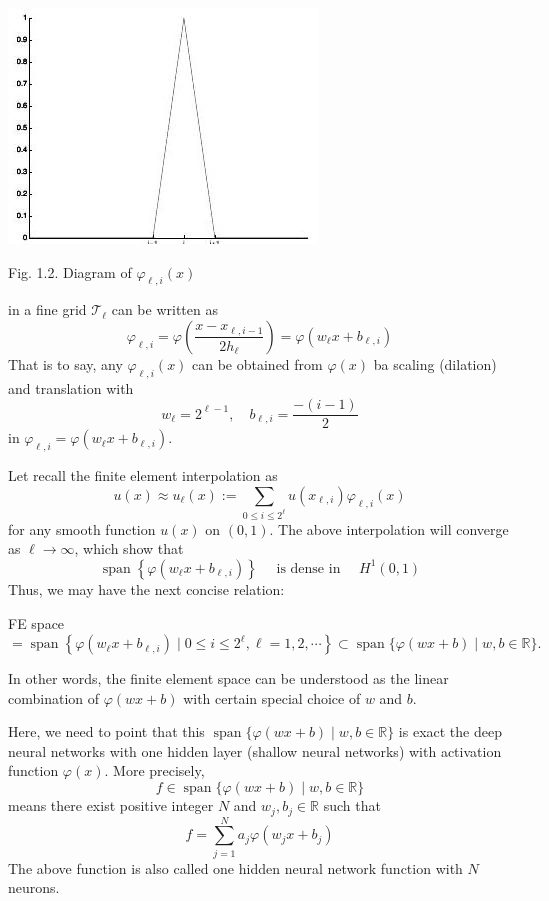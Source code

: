 \documentclass[10pt]{article}
\begin{document}
\includegraphics[max width=\textwidth]{2022_01_05_e65f0d6bf0db4974ee45g-06}

Fig. 1.2. Diagram of $\varphi_{\ell, i}(x)$

in a fine grid $\mathcal{T}_{\ell}$ can be written as
$$
\varphi_{\ell, i}=\varphi\left(\frac{x-x_{\ell, i-1}}{2 h_{\ell}}\right)=\varphi\left(w_{\ell} x+b_{\ell, i}\right)
$$
That is to say, any $\varphi_{\ell, i}(x)$ can be obtained from $\varphi(x)$ ba scaling (dilation) and translation with
$$
w_{\ell}=2^{\ell-1}, \quad b_{\ell, i}=\frac{-(i-1)}{2}
$$
in $\varphi_{\ell, i}=\varphi\left(w_{\ell} x+b_{\ell, i}\right)$.

Let recall the finite element interpolation as
$$
u(x) \approx u_{\ell}(x):=\sum_{0 \leq i \leq 2^{\ell}} u\left(x_{\ell, i}\right) \varphi_{\ell, i}(x)
$$
for any smooth function $u(x)$ on $(0,1)$. The above interpolation will converge as $\ell \rightarrow \infty$, which show that
$$
\operatorname{span}\left\{\varphi\left(w_{\ell} x+b_{\ell, i}\right)\right\} \quad \text { is dense in } \quad H^{1}(0,1)
$$
Thus, we may have the next concise relation:

FE space $=\operatorname{span}\left\{\varphi\left(w_{\ell} x+b_{\ell, i}\right) \mid 0 \leq i \leq 2^{\ell}, \ell=1,2, \cdots\right\} \subset \operatorname{span}\{\varphi(w x+b) \mid w, b \in \mathbb{R}\} .$

In other words, the finite element space can be understood as the linear combination of $\varphi(w x+b)$ with certain special choice of $w$ and $b$.

Here, we need to point that this $\operatorname{span}\{\varphi(w x+b) \mid w, b \in \mathbb{R}\}$ is exact the deep neural networks with one hidden layer (shallow neural networks) with activation function $\varphi(x)$. More precisely,
$$
f \in \operatorname{span}\{\varphi(w x+b) \mid w, b \in \mathbb{R}\}
$$
means there exist positive integer $N$ and $w_{j}, b_{j} \in \mathbb{R}$ such that
$$
f=\sum_{j=1}^{N} a_{j} \varphi\left(w_{j} x+b_{j}\right)
$$
The above function is also called one hidden neural network function with $N$ neurons.
\end{document}
